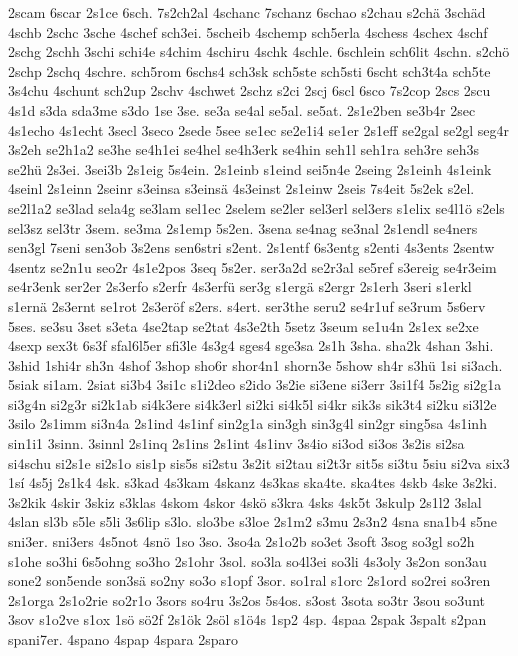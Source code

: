 {2scam
6scar
2s1ce
6sch.
7s2ch2al
4schanc
7schanz
6schao
s2chau
s2chä
3schäd
4schb
2schc
3sche
4schef
sch3ei.
5scheib
4schemp
sch5erla
4schess
4schex
4schf
2schg
2schh
3schi
schi4e
s4chim
4schiru
4schk
4schle.
6schlein
sch6lit
4schn.
s2chö
2schp
2schq
4schre.
sch5rom
6schs4
sch3sk
sch5ste
sch5sti
6scht
sch3t4a
sch5te
3s4chu
4schunt
sch2up
2schv
4schwet
2schz
s2ci
2scj
6scl
6sco
7s2cop
2scs
2scu
4s1d
s3da
sda3me
s3do
1se
3se.
se3a
se4al
se5al.
se5at.
2s1e2ben
se3b4r
2sec
4s1echo
4s1echt
3secl
3seco
2sede
5see
se1ec
se2e1i4
se1er
2s1eff
se2gal
se2gl
seg4r
3s2eh
se2h1a2
se3he
se4h1ei
se4hel
se4h3erk
se4hin
seh1l
seh1ra
seh3re
seh3s
se2hü
2s3ei.
3sei3b
2s1eig
5s4ein.
2s1einb
s1eind
sei5n4e
2seing
2s1einh
4s1eink
4seinl
2s1einn
2seinr
s3einsa
s3einsä
4s3einst
2s1einw
2seis
7s4eit
5s2ek
s2el.
se2l1a2
se3lad
sela4g
se3lam
sel1ec
2selem
se2ler
sel3erl
sel3ers
s1elix
se4l1ö
s2els
sel3sz
sel3tr
3sem.
se3ma
2s1emp
5s2en.
3sena
se4nag
se3nal
2s1endl
se4ners
sen3gl
7seni
sen3ob
3s2ens
sen6stri
s2ent.
2s1entf
6s3entg
s2enti
4s3ents
2sentw
4sentz
se2n1u
seo2r
4s1e2pos
3seq
5s2er.
ser3a2d
se2r3al
se5ref
s3ereig
se4r3eim
se4r3enk
ser2er
2s3erfo
s2erfr
4s3erfü
ser3g
s1ergä
s2ergr
2s1erh
3seri
s1erkl
s1ernä
2s3ernt
se1rot
2s3eröf
s2ers.
s4ert.
ser3the
seru2
se4r1uf
se3rum
5s6erv
5ses.
se3su
3set
s3eta
4se2tap
se2tat
4s3e2th
5setz
3seum
se1u4n
2s1ex
se2xe
4sexp
sex3t
6s3f
sfal6l5er
sfi3le
4s3g4
sges4
sge3sa
2s1h
3sha.
sha2k
4shan
3shi.
3shid
1shi4r
sh3n
4shof
3shop
sho6r
shor4n1
shorn3e
5show
sh4r
s3hü
1si
si3ach.
5siak
si1am.
2siat
si3b4
3si1c
s1i2deo
s2ido
3s2ie
si3ene
si3err
3si1f4
5s2ig
si2g1a
si3g4n
si2g3r
si2k1ab
si4k3ere
si4k3erl
si2ki
si4k5l
si4kr
sik3s
sik3t4
si2ku
si3l2e
3silo
2s1imm
si3n4a
2s1ind
4s1inf
sin2g1a
sin3gh
sin3g4l
sin2gr
sing5sa
4s1inh
sin1i1
3sinn.
3sinnl
2s1inq
2s1ins
2s1int
4s1inv
3s4io
si3od
si3os
3s2is
si2sa
si4schu
si2s1e
si2s1o
sis1p
sis5s
si2stu
3s2it
si2tau
si2t3r
sit5s
si3tu
5siu
si2va
six3
1sí
4s5j
2s1k4
4sk.
s3kad
4s3kam
4skanz
4s3kas
ska4te.
ska4tes
4skb
4ske
3s2ki.
3s2kik
4skir
3skiz
s3klas
4skom
4skor
4skö
s3kra
4sks
4sk5t
3skulp
2s1l2
3slal
4slan
sl3b
s5le
s5li
3s6lip
s3lo.
slo3be
s3loe
2s1m2
s3mu
2s3n2
4sna
sna1b4
s5ne
sni3er.
sni3ers
4s5not
4snö
1so
3so.
3so4a
2s1o2b
so3et
3soft
3sog
so3gl
so2h
s1ohe
so3hi
6s5ohng
so3ho
2s1ohr
3sol.
so3la
so4l3ei
so3li
4s3oly
3s2on
son3au
sone2
son5ende
son3sä
so2ny
so3o
s1opf
3sor.
so1ral
s1orc
2s1ord
so2rei
so3ren
2s1orga
2s1o2rie
so2r1o
3sors
so4ru
3s2os
5s4os.
s3ost
3sota
so3tr
3sou
so3unt
3sov
s1o2ve
s1ox
1sö
sö2f
2s1ök
2söl
s1ö4s
1sp2
4sp.
4spaa
2spak
3spalt
s2pan
spani7er.
4spano
4spap
4spara
2sparo
}
